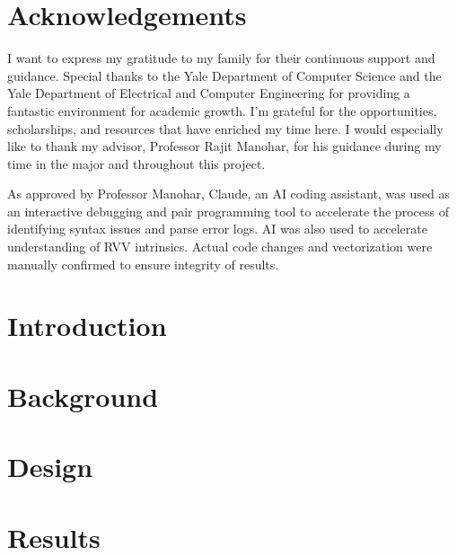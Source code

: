 \documentclass[12pt,twoside]{report}
\begin{document}


\chapter*{Acknowledgements}
I want to express my gratitude to my family for their continuous support and guidance. Special thanks to the Yale Department of Computer Science and the Yale Department of Electrical and Computer Engineering for providing a fantastic environment for academic growth. I'm grateful for the opportunities, scholarships, and resources that have enriched my time here. I would especially like to thank my advisor, Professor Rajit Manohar, for his guidance during my time in the major and throughout this project. 


As approved by Professor Manohar, Claude, an AI coding assistant, was used as an interactive
debugging and pair programming tool to accelerate the process of
identifying syntax issues and parse error logs. AI was also used to
accelerate understanding of RVV intrinsics. Actual code changes and
vectorization were manually confirmed to ensure integrity of results.

{
  \hypersetup{linkcolor=black}
  \tableofcontents
}

\clearpage




\chapter{Introduction}


\chapter{Background} \label{ch:background}


\chapter{Design} \label{ch:methodology}



\chapter{Results} \label{ch:results}

\end{document}
